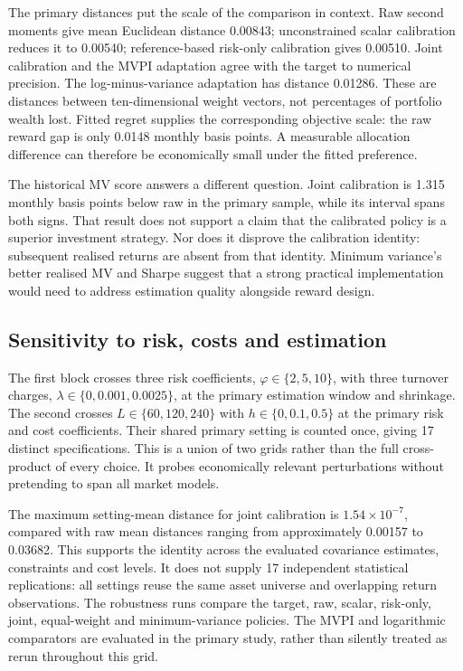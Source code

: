 \documentclass[sigconf,anonymous,review]{acmart}
\begin{document}
The primary distances put the scale of the comparison in context. Raw second moments give mean Euclidean distance 0.00843; unconstrained scalar calibration reduces it to 0.00540; reference-based risk-only calibration gives 0.00510. Joint calibration and the MVPI adaptation agree with the target to numerical precision. The log-minus-variance adaptation has distance 0.01286. These are distances between ten-dimensional weight vectors, not percentages of portfolio wealth lost. Fitted regret supplies the corresponding objective scale: the raw reward gap is only 0.0148 monthly basis points. A measurable allocation difference can therefore be economically small under the fitted preference.

The historical MV score answers a different question. Joint calibration is 1.315 monthly basis points below raw in the primary sample, while its interval spans both signs. That result does not support a claim that the calibrated policy is a superior investment strategy. Nor does it disprove the calibration identity: subsequent realised returns are absent from that identity. Minimum variance's better realised MV and Sharpe suggest that a strong practical implementation would need to address estimation quality alongside reward design.

\subsection{Sensitivity to risk, costs and estimation}
The first block crosses three risk coefficients, $\varphi\in\{2,5,10\}$, with three turnover charges, $\lambda\in\{0,0.001,0.0025\}$, at the primary estimation window and shrinkage. The second crosses $L\in\{60,120,240\}$ with $h\in\{0,0.1,0.5\}$ at the primary risk and cost coefficients. Their shared primary setting is counted once, giving 17 distinct specifications. This is a union of two grids rather than the full cross-product of every choice. It probes economically relevant perturbations without pretending to span all market models.

The maximum setting-mean distance for joint calibration is $1.54\times10^{-7}$, compared with raw mean distances ranging from approximately 0.00157 to 0.03682. This supports the identity across the evaluated covariance estimates, constraints and cost levels. It does not supply 17 independent statistical replications: all settings reuse the same asset universe and overlapping return observations. The robustness runs compare the target, raw, scalar, risk-only, joint, equal-weight and minimum-variance policies. The MVPI and logarithmic comparators are evaluated in the primary study, rather than silently treated as rerun throughout this grid.
\end{document}
